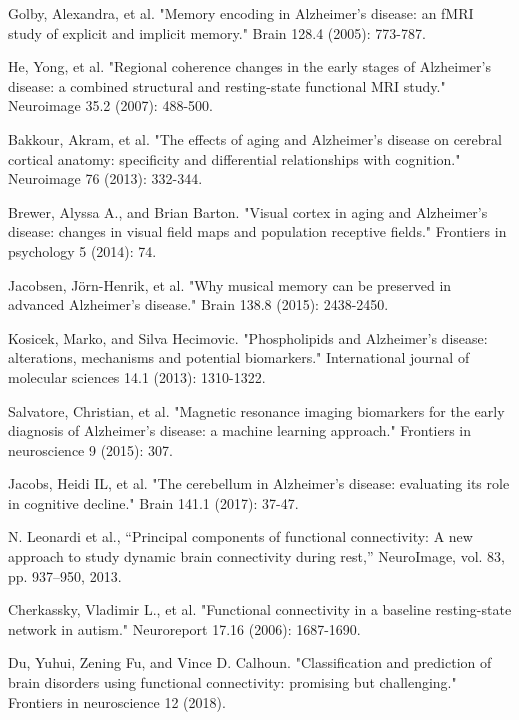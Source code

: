 \documentclass[preprint,12pt]{elsarticle}
\begin{document}
\begin{thebibliography}{1}
			Golby, Alexandra, et al. "Memory encoding in Alzheimer's disease: an fMRI study of explicit and implicit memory." Brain 128.4 (2005): 773-787.
			
			He, Yong, et al. "Regional coherence changes in the early stages of Alzheimer’s disease: a combined structural and resting-state functional MRI study." Neuroimage 35.2 (2007): 488-500.
			
			
			
			Bakkour, Akram, et al. "The effects of aging and Alzheimer's disease on cerebral cortical anatomy: specificity and differential relationships with cognition." Neuroimage 76 (2013): 332-344.
			
			Brewer, Alyssa A., and Brian Barton. "Visual cortex in aging and Alzheimer's disease: changes in visual field maps and population receptive fields." Frontiers in psychology 5 (2014): 74.
			
			Jacobsen, Jörn-Henrik, et al. "Why musical memory can be preserved in advanced Alzheimer’s disease." Brain 138.8 (2015): 2438-2450.
			
			Kosicek, Marko, and Silva Hecimovic. "Phospholipids and Alzheimer’s disease: alterations, mechanisms and potential biomarkers." International journal of molecular sciences 14.1 (2013): 1310-1322.
			
			Salvatore, Christian, et al. "Magnetic resonance imaging biomarkers for the early diagnosis of Alzheimer's disease: a machine learning approach." Frontiers in neuroscience 9 (2015): 307.
			
			
			Jacobs, Heidi IL, et al. "The cerebellum in Alzheimer’s disease: evaluating its role in cognitive decline." Brain 141.1 (2017): 37-47.
			
			N. Leonardi et al., “Principal components of functional connectivity: A
			new approach to study dynamic brain connectivity during rest,” NeuroImage,
			vol. 83, pp. 937–950, 2013.
			
			Cherkassky, Vladimir L., et al. "Functional connectivity in a baseline resting-state network in autism." Neuroreport 17.16 (2006): 1687-1690.
		
			
			
			Du, Yuhui, Zening Fu, and Vince D. Calhoun. "Classification and prediction of brain disorders using functional connectivity: promising but challenging." Frontiers in neuroscience 12 (2018).
			

\end{thebibliography}
\end{document}
